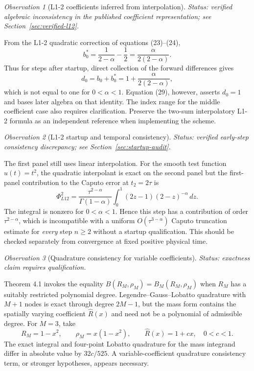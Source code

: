 \documentclass[11pt,a4paper]{amsart}
\theoremstyle{remark}
\newtheorem{observation}{Observation}
\theoremstyle{plain}
\theoremstyle{remark}
\newcommand{\auditstatus}[1]{\par\noindent\emph{#1.}\enspace}
\numberwithin{equation}{section}
\begin{document}
\begin{observation}[L1-2 coefficients inferred from interpolation]
\auditstatus{Status: verified algebraic inconsistency in the published coefficient representation; see Section~\ref{sec:verified-l12}}

From the L1-2 quadratic correction of equations (23)--(24),
\[
 b_0^*=\frac{1}{2-\alpha}-\frac12=\frac{\alpha}{2(2-\alpha)}.
\]
Thus for steps after startup, direct collection of the forward differences gives
\[
 d_0=b_0+b_0^*=1+\frac{\alpha}{2(2-\alpha)},
\]
which is not equal to one for $0<\alpha<1$. Equation (29), however, asserts $d_0=1$ and bases later algebra on that identity. The index range for the middle coefficient case also requires clarification. Preserve the two-sum interpolatory L1-2 formula as an independent reference when implementing the scheme.
\end{observation}

\begin{observation}[L1-2 startup and temporal consistency]
\auditstatus{Status: verified early-step consistency discrepancy; see Section~\ref{sec:startup-audit}}

The first panel still uses linear interpolation. For the smooth test function $u(t)=t^2$, the quadratic interpolant is exact on the second panel but the first-panel contribution to the Caputo error at $t_2=2\tau$ is
\[
 \Phi_{L12}^{2}
 =\frac{\tau^{2-\alpha}}{\Gamma(1-\alpha)}
  \int_0^1(2z-1)(2-z)^{-\alpha}\,dz.
\]
The integral is nonzero for $0<\alpha<1$. Hence this step has a contribution of order $\tau^{2-\alpha}$, which is incompatible with a uniform $O(\tau^{3-\alpha})$ Caputo truncation estimate for \emph{every} step $n\geq2$ without a startup qualification. This should be checked separately from convergence at fixed positive physical time.
\end{observation}

\begin{observation}[Quadrature consistency for variable coefficients]
\auditstatus{Status: exactness claim requires qualification}

Theorem 4.1 invokes the equality $B(R_M,\rho_M)=B_M(R_M,\rho_M)$ when $R_M$ has a suitably restricted polynomial degree. Legendre--Gauss--Lobatto quadrature with $M+1$ nodes is exact through degree $2M-1$, but the mass form contains the spatially varying coefficient $\widehat R(x)$ and need not be a polynomial of admissible degree. For $M=3$, take
\[
 R_M=1-x^2,\qquad \rho_M=x(1-x^2),\qquad \widehat R(x)=1+cx,
 \quad 0<c<1.
\]
The exact integral and four-point Lobatto quadrature for the mass integrand differ in absolute value by $32c/525$. A variable-coefficient quadrature consistency term, or stronger hypotheses, appears necessary.
\end{observation}
\end{document}
